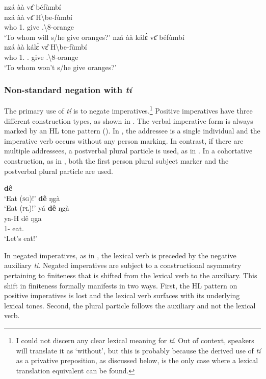 \documentclass[output=paper,colorlinks=true, citecolor=brown,draftmode]{langscibook}
\begin{document}
\ea\label{QIO}
\ea\label{QIOa}
  \glll  nzá àà vɛ̂ béfùmbí \\
         nzá àà vɛ̂ {H\backslash{}be-fùmbí}\\
         who 1.{\FUT} give {{\OBJ}.{\LINK}\backslash{}8-orange}\\
    \trans `To whom will s/he give oranges?'
\ex\label{QIOb}
  \glll  nzá àà kálɛ̀ vɛ̂ béfùmbí \\
         nzá àà kálɛ̀ vɛ̂ {H\backslash{}be-fùmbí}\\
         who 1.{\FUT} {\NEG}.{\FUT} give {{\OBJ}.{\LINK}\backslash{}8-orange}\\
    \trans `To whom won't s/he give oranges?'
\z    
\z

\subsubsection{Non-standard negation with {\itshape tí}}
\label{sec:gye:ti}

The primary use of {\itshape tí} is to negate imperatives.\footnote{I could not discern any clear lexical meaning for {\itshape tí}. Out of context, speakers will translate it as `without', but this is probably because the derived use of {\itshape tí} as a privative preposition, as discussed below, is the only case where a lexical translation equivalent can be found.} Positive imperatives have three different construction types, as shown in . The verbal imperative form is always marked by an HL tone pattern (). In , the addressee is a single individual and the imperative verb occurs without any person marking. In contrast, if there are multiple addressees, a postverbal plural particle is used, as in . In a cohortative construction, as in , both the first person plural subject marker and the postverbal plural particle are used.

\ea\label{IMPpos} 
    \ea\label{IMPposa} {\bfseries dê} \\
        \trans `Eat (\textsc{sg})!' 
    \ex\label{IMPposb} {\bfseries dê} ŋgà \\
        \trans `Eat (\textsc{pl})!'
    \ex\label{IMPposc} 
        \glll yá {\bfseries dê} ŋgà \\
        ya-H dê ŋga \\
        1{\PL}-{\PRS} eat.{\SBJV} {\PL} \\
        \trans `Let's eat!'
    \z
\z

In negated imperatives, as in , the lexical verb is preceded by the negative auxiliary {\itshape tí}. Negated imperatives are subject to a constructional asymmetry pertaining to finiteness that is shifted from the lexical verb to the auxiliary. This shift in finiteness formally manifests in two ways. First, the HL pattern on positive imperatives is lost and the lexical verb surfaces with its underlying lexical tones. Second, the plural particle follows the auxiliary and not the lexical verb. 
\end{document}
